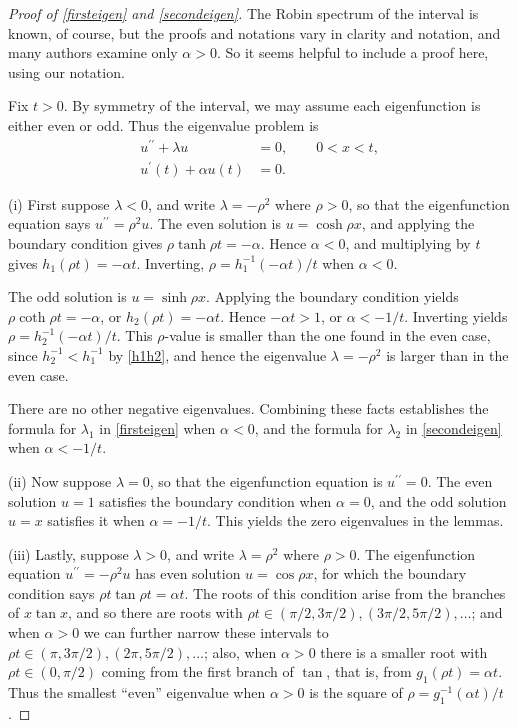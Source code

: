 \documentclass[12pt,reqno]{amsart}
\theoremstyle{definition}
\begin{document}
%
\begin{proof}[Proof of \autoref{firsteigen} and \autoref{secondeigen}]
The Robin spectrum of the interval is known, of course, but the proofs and notations vary in clarity and notation, and many authors examine only $\alpha>0$. So it seems helpful to include a proof here, using our notation. 

Fix $t>0$. By symmetry of the interval, we may assume each eigenfunction is either even or odd. Thus the eigenvalue problem is  
\[
\begin{split}
u^{\prime \prime} +  \lambda u & =0 , \qquad 0<x<t,\\
u^\prime(t) + \alpha u(t) & = 0 .
\end{split}
\]

(i) First suppose $\lambda<0$, and write $\lambda= -\rho^2$ where $\rho>0$, so that the eigenfunction equation says $u^{\prime \prime}=\rho^2 u$. The even solution is $u=\cosh \rho x$, and applying the boundary condition gives $\rho \tanh \rho t = -\alpha$. Hence $\alpha < 0$, and multiplying by $t$ gives $h_1(\rho t) = -\alpha t$. Inverting, $\rho = h_1^{-1}(-\alpha t)/t$ when $\alpha<0$. 

The odd solution is $u=\sinh \rho x$. Applying the boundary condition yields $\rho \coth \rho t = -\alpha$, or $h_2(\rho t) = -\alpha t$. Hence $- \alpha t > 1$, or $\alpha < -1/t$. Inverting yields $\rho = h_2^{-1}(-\alpha t)/t$. This $\rho$-value is smaller than the one found in the even case, since $h_2^{-1} < h_1^{-1}$ by \eqref{h1h2}, and hence the eigenvalue $\lambda=-\rho^2$ is larger than in the even case. 

There are no other negative eigenvalues. Combining these facts establishes the formula for $\lambda_1$ in \autoref{firsteigen} when $\alpha<0$, and the formula for $\lambda_2$ in \autoref{secondeigen} when $\alpha<-1/t$. 

(ii) Now suppose $\lambda=0$, so that the eigenfunction equation is $u^{\prime \prime}=0$. The even solution $u=1$ satisfies the boundary condition when $\alpha=0$, and the odd solution $u=x$ satisfies it when $\alpha=-1/t$. This yields the zero eigenvalues in the lemmas. 

(iii) Lastly, suppose $\lambda>0$, and write $\lambda= \rho^2$ where $\rho>0$. The eigenfunction equation $u^{\prime \prime}= -\rho^2 u$ has even solution $u=\cos \rho x$, for which the boundary condition says $\rho t \tan \rho t = \alpha t$. The roots of this condition arise from the branches of $x\tan x$, and so there are roots with $\rho t \in (\pi/2,3\pi/2), (3\pi/2,5\pi/2),\ldots$; and when $\alpha>0$ we can further narrow these intervals to $\rho t \in (\pi,3\pi/2), (2\pi,5\pi/2), \ldots$; also, when $\alpha>0$ there is a smaller root with $\rho t \in (0,\pi/2)$ coming from the first branch of $\tan$, that is, from $g_1(\rho t)=\alpha t$. Thus the smallest ``even'' eigenvalue when $\alpha>0$ is the square of $\rho = g_1^{-1}(\alpha t)/t$. 


\end{proof}
\end{document}
